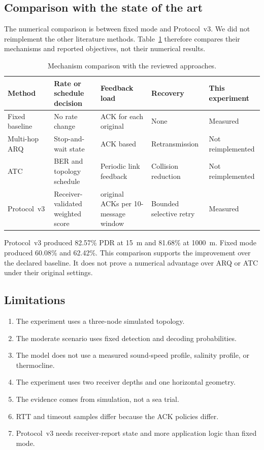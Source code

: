 \documentclass[11pt]{article}
\begin{document}
\subsection{Comparison with the state of the art}\label{sec:res-sota}
\noindent
The numerical comparison is between fixed mode and Protocol~v3.
We did not reimplement the other literature methods.
Table~\ref{tab:sota} therefore compares their mechanisms and reported objectives, not their numerical results.

\begin{table}[H]
\centering\footnotesize\setlength{\tabcolsep}{3pt}
\caption{Mechanism comparison with the reviewed approaches.}\label{tab:sota}
\begin{tabular}{>{\raggedright\arraybackslash}p{2.7cm} >{\raggedright\arraybackslash}p{3.4cm} >{\raggedright\arraybackslash}p{3.6cm} >{\raggedright\arraybackslash}p{3.4cm} >{\raggedright\arraybackslash}p{2.1cm}}
\toprule
Method & Rate or schedule decision & Feedback load & Recovery & This experiment \\
\midrule
Fixed baseline & No rate change & ACK for each original & None & Measured \\
Multi-hop ARQ~\cite{tan2007} & Stop-and-wait state & ACK based & Retransmission & Not reimplemented \\
ATC~\cite{guo2008} & BER and topology schedule & Periodic link feedback & Collision reduction & Not reimplemented \\
Protocol~v3 & Receiver-validated weighted score & 2 original ACKs per 10-message window & Bounded selective retry & Measured \\
\bottomrule
\end{tabular}
\end{table}

Protocol~v3 produced 82.57\% PDR at 15~m and 81.68\% at 1000~m.
Fixed mode produced 60.08\% and 62.42\%.
This comparison supports the improvement over the declared baseline.
It does not prove a numerical advantage over ARQ or ATC under their original settings.

\subsection{Limitations}\label{sec:res-limits}
\begin{enumerate}\setlength{\itemsep}{2pt}
  \item The experiment uses a three-node simulated topology.
  \item The moderate scenario uses fixed detection and decoding probabilities.
  \item The model does not use a measured sound-speed profile, salinity profile, or thermocline.
  \item The experiment uses two receiver depths and one horizontal geometry.
  \item The evidence comes from simulation, not a sea trial.
  \item RTT and timeout samples differ because the ACK policies differ.
  \item Protocol~v3 needs receiver-report state and more application logic than fixed mode.
\end{enumerate}
\end{document}
